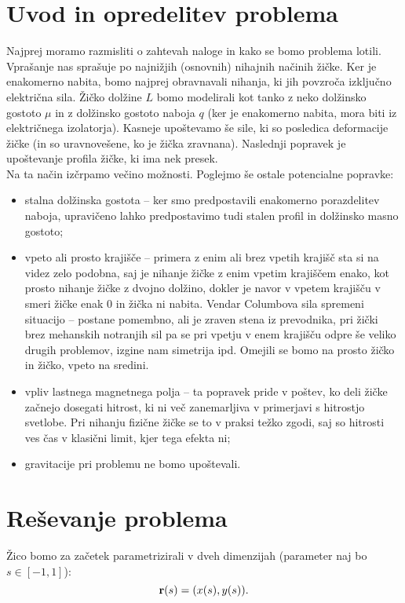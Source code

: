 \documentclass{article}
\begin{document}

\section{Uvod in opredelitev problema}
Najprej moramo razmisliti o zahtevah naloge in kako se bomo problema lotili. Vprašanje nas sprašuje po najnižjih (osnovnih) nihajnih načinih žičke. Ker je enakomerno nabita, bomo najprej obravnavali nihanja, ki jih povzroča izključno električna sila. Žičko dolžine $L$ bomo modelirali kot tanko z neko dolžinsko gostoto $\mu$ in z dolžinsko gostoto naboja $q$ (ker je enakomerno nabita, mora biti iz električnega izolatorja). Kasneje upoštevamo še sile, ki so posledica deformacije žičke (in so uravnovešene, ko je žička zravnana). Naslednji popravek je upoštevanje profila žičke, ki ima nek presek.\\
Na ta način izčrpamo večino možnosti. Poglejmo še ostale potencialne popravke:
\begin{itemize}
    \item stalna dolžinska gostota -- ker smo predpostavili enakomerno porazdelitev naboja, upravičeno lahko predpostavimo tudi stalen profil in dolžinsko masno gostoto;
    \item vpeto ali prosto krajišče -- primera z enim ali brez vpetih krajišč sta si na videz zelo podobna, saj je nihanje žičke z enim vpetim krajiščem enako, kot prosto nihanje žičke z dvojno dolžino, dokler je navor v vpetem krajišču v smeri žičke enak 0 in žička ni nabita. Vendar Columbova sila spremeni situacijo -- postane pomembno, ali je zraven stena iz prevodnika, pri žički brez mehanskih notranjih sil pa se pri vpetju v enem krajišču odpre še veliko drugih problemov, izgine nam simetrija ipd. Omejili se bomo na prosto žičko in žičko, vpeto na sredini.
    \item vpliv lastnega magnetnega polja -- ta popravek pride v poštev, ko deli žičke začnejo dosegati hitrost, ki ni več zanemarljiva v primerjavi s hitrostjo svetlobe. Pri nihanju fizične žičke se to v praksi težko zgodi, saj so hitrosti ves čas v klasični limit, kjer tega efekta ni;
    \item gravitacije pri problemu ne bomo upoštevali.
\end{itemize}

\section{Reševanje problema}
Žico bomo za začetek parametrizirali v dveh dimenzijah (parameter naj bo $s\in[-1,1]$):
\begin{equation}
    \mathbf{r}(s) = (x(s), y(s)).
\end{equation}
\end{document}

